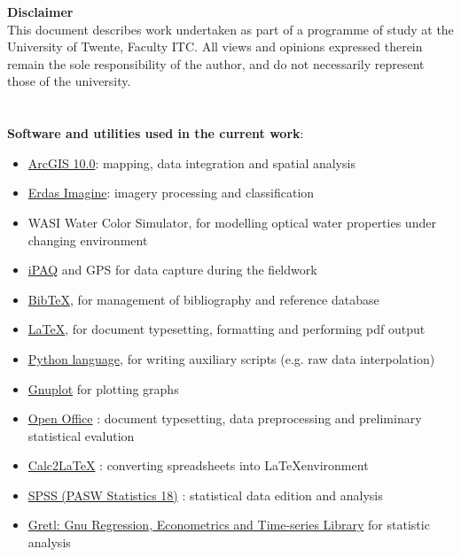 \documentclass[10pt, a4paper]{article}
\begin{document}
\pagebreak

\begin{abstract}
\end{abstract}

\pagebreak
\textbf{Disclaimer}\\

This document describes work undertaken as part of a programme of study at the University of
Twente, Faculty ITC. All views and opinions expressed therein remain the sole responsibility of
the author, and do not necessarily represent those of the university.\\

\pagebreak

\section*{}
\tableofcontents 

\textbf{Software and utilities used in the current work}:\\
\begin{itemize}
\item \href{http://www.esri.com/software/arcgis/index.html}{ArcGIS 10.0}: mapping, data integration and spatial analysis
\item \href{http://www.erdas.com/products/ERDASIMAGINE/ERDASIMAGINE/Details.aspx}{Erdas Imagine}: imagery processing and classification
\item WASI Water Color Simulator, for modelling optical water properties under changing environment
\item \href{http://welcome.hp.com/country/us/en/prodserv/handheld.html}{iPAQ} and GPS for data capture during the fieldwork
\item \href{http://www.bibtex.org/de/}{BibTeX}, for management of bibliography and reference database
\item \href{http://www.latex-project.org/}{\LaTeX}, for document typesetting, formatting and performing pdf output
\item \href{http://www.python.org/}{Python language}, for writing auxiliary scripts (e.g. raw data interpolation)
\item \href{http://www.gnuplot.info/}{Gnuplot} for plotting graphs
\item \href{http://www.openoffice.org/}{Open Office} : document typesetting, data preprocessing and preliminary statistical evalution
\item \href{http://calc2latex.sourceforge.net/}{Calc2LaTeX} : converting spreadsheets into \LaTeX environment
\item \href{http://www.spss.com/}{SPSS (PASW Statistics 18)} : statistical data edition and analysis 
\item \href{http://gretl.sourceforge.net/}{Gretl: Gnu Regression, Econometrics and Time-series Library} for statistic analysis
\end{itemize}
\pagebreak
\end{document}
